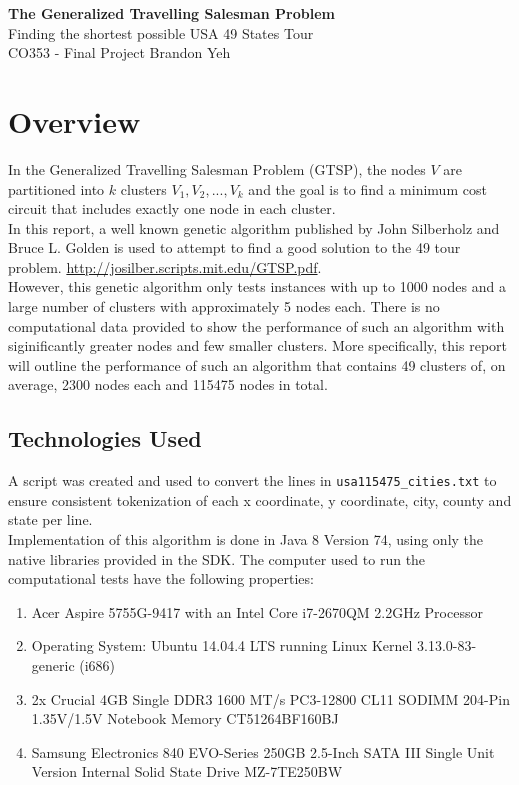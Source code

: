 \documentclass[12pt]{article}
\begin{document}
\begin{center}
\vspace*{6cm}
\textbf{\LARGE The Generalized Travelling Salesman Problem}\\
\Large Finding the shortest possible USA 49 States Tour\\

\large CO353 - Final Project
\large Brandon Yeh\\
\end{center}

\newpage

\section{Overview}

In the Generalized Travelling Salesman Problem (GTSP), the nodes $V$ are partitioned into $k$ clusters $V_1,V_2,...,V_k$ and the goal is to find a minimum cost circuit that includes exactly one node in each cluster.\\

In this report, a well known genetic algorithm published by John Silberholz and Bruce L. Golden is used to attempt to find a good solution to the 49 tour problem. \url{http://josilber.scripts.mit.edu/GTSP.pdf}.\\

However, this genetic algorithm only tests instances with up to 1000 nodes and a large number of clusters with approximately 5 nodes each. There is no computational data provided to show the performance of such an algorithm with siginificantly greater nodes and few smaller clusters. More specifically, this report will outline the performance of such an algorithm that contains 49 clusters of, on average, 2300 nodes each and 115475 nodes in total.

\subsection{Technologies Used}

A script was created and used to convert the lines in \verb|usa115475_cities.txt| to ensure consistent tokenization of each x coordinate, y coordinate, city, county and state per line.\\

Implementation of this algorithm is done in Java 8 Version 74, using only the native libraries provided in the SDK. The computer used to run the computational tests have the following properties:
\begin{enumerate}
  \item Acer Aspire 5755G-9417 with an Intel Core i7-2670QM 2.2GHz Processor
  \item Operating System: Ubuntu 14.04.4 LTS running Linux Kernel 3.13.0-83-generic (i686)
  \item 2x Crucial 4GB Single DDR3 1600 MT/s PC3-12800 CL11 SODIMM 204-Pin 1.35V/1.5V Notebook Memory CT51264BF160BJ 
  \item Samsung Electronics 840 EVO-Series 250GB 2.5-Inch SATA III Single Unit Version Internal Solid State Drive MZ-7TE250BW 
\end{enumerate}
\end{document}
